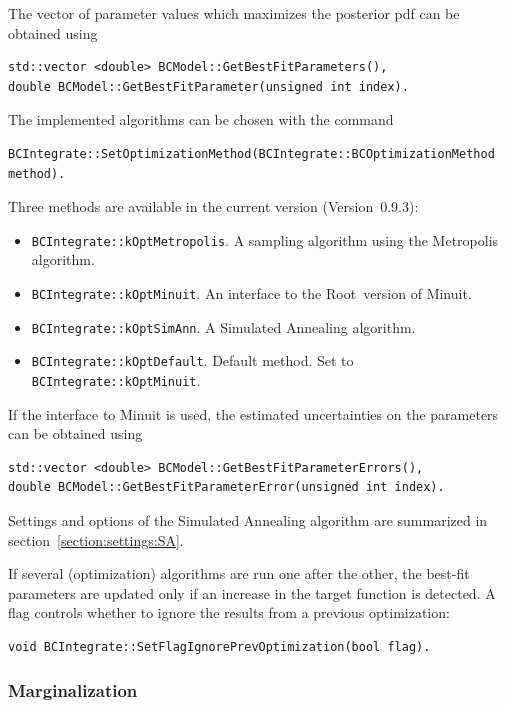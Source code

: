 \documentclass[11pt, a4paper]{article}
\newcommand{\Root}{{\sc Root}}
\newcommand{\versionno}{0.9.3}
\newcommand{\Version}{Version~\versionno}
\begin{document}
The vector of parameter values which maximizes the posterior pdf can be obtained using
%
\begin{verbatim}
std::vector <double> BCModel::GetBestFitParameters(),
double BCModel::GetBestFitParameter(unsigned int index).
\end{verbatim}
%
The implemented algorithms can be chosen with the command
%
\begin{verbatim}
BCIntegrate::SetOptimizationMethod(BCIntegrate::BCOptimizationMethod method).
\end{verbatim}
%
Three methods are available in the current version (\Version):
%
\begin{itemize}
\item \verb|BCIntegrate::kOptMetropolis|. A sampling algorithm using the
  Metropolis algorithm.
\item \verb|BCIntegrate::kOptMinuit|. An interface to the \Root\ version
  of Minuit.
\item \verb|BCIntegrate::kOptSimAnn|. A Simulated Annealing algorithm.
\item \verb|BCIntegrate::kOptDefault|. Default method. Set to
  \verb|BCIntegrate::kOptMinuit|.
\end{itemize}
%
If the interface to Minuit is used, the estimated uncertainties on the
parameters can be obtained using
%
\begin{verbatim}
std::vector <double> BCModel::GetBestFitParameterErrors(),
double BCModel::GetBestFitParameterError(unsigned int index).
\end{verbatim}
%
Settings and options of the Simulated Annealing algorithm are
summarized in section~\ref{section:settings:SA}.

If several (optimization) algorithms are run one after the other, the
best-fit parameters are updated only if an increase in the target
function is detected. A flag controls whether to ignore the results
from a previous optimization:
%
\begin{verbatim}
void BCIntegrate::SetFlagIgnorePrevOptimization(bool flag).
\end{verbatim}


\subsubsection{Marginalization}
\label{subsubsection:marginalization}
\end{document}
